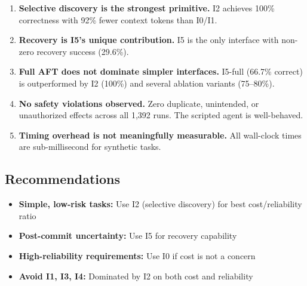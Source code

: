 \begin{enumerate}
    \item \textbf{Selective discovery is the strongest primitive.} I2 achieves 100\% correctness with 92\% fewer context tokens than I0/I1.
    
    \item \textbf{Recovery is I5's unique contribution.} I5 is the only interface with non-zero recovery success (29.6\%).
    
    \item \textbf{Full AFT does not dominate simpler interfaces.} I5-full (66.7\% correct) is outperformed by I2 (100\%) and several ablation variants (75--80\%).
    
    \item \textbf{No safety violations observed.} Zero duplicate, unintended, or unauthorized effects across all 1,392 runs. The scripted agent is well-behaved.
    
    \item \textbf{Timing overhead is not meaningfully measurable.} All wall-clock times are sub-millisecond for synthetic tasks.
\end{enumerate}

\subsection{Recommendations}

\begin{itemize}
    \item \textbf{Simple, low-risk tasks:} Use I2 (selective discovery) for best cost/reliability ratio
    \item \textbf{Post-commit uncertainty:} Use I5 for recovery capability
    \item \textbf{High-reliability requirements:} Use I0 if cost is not a concern
    \item \textbf{Avoid I1, I3, I4:} Dominated by I2 on both cost and reliability
\end{itemize}


